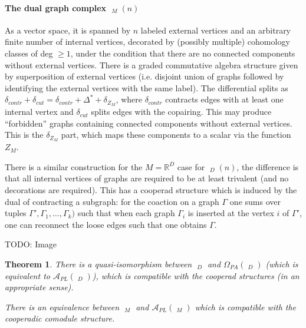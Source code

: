\documentclass{scrartcl}
\theoremstyle{plain}
\newtheorem{theorem}{Theorem}[section]
\theoremstyle{definition}
\newcommand{\R}{\mathbb R}
\DeclareMathOperator{\cConf}{\overline{Conf}}
\DeclareMathOperator{\coGraphs}{{}^*Graphs}
\begin{document}
\paragraph{The dual graph complex $\coGraphs_M(n)$} As a vector space, it is spanned by $n$ labeled external vertices and an arbitrary finite number of internal vertices, decorated by (possibly multiple) cohomology classes of deg $\geq 1$, under the condition that there are no connected components without external vertices. There is a graded commutative algebra structure given by superposition of external vertices (i.e. disjoint union of graphs followed by identifying the external vertices with the same label). The differential splits as $\delta_{contr} + \delta_{cut} = \delta_{contr} + \Delta^* + \delta_{Z_M}$, where $\delta_{contr}$ contracts edges with at least one internal vertex and $\delta_{cut}$ splits edges with the copairing. This may produce ``forbidden'' graphs containing connected components without external vertices. This is the $\delta_{Z_M}$ part, which maps these components to a scalar via the function $Z_M$.

There is a similar construction for the $M=\R^D$ case for $\coGraphs_D(n)$, the difference is that all internal vertices of graphs are required to be at least trivalent (and no decorations are required). This has a cooperad structure which is induced by the dual of contracting a subgraph: for the coaction on a graph $\Gamma$ one sums over tuples $\Gamma', \Gamma_1, \dots, \Gamma_k)$ such that when each graph $\Gamma_i$ is inserted at the vertex $i$ of $\Gamma'$, one can reconnect the loose edges such that one obtains $\Gamma$.  

TODO: Image

\begin{theorem}
There is a quasi-isomorphism between $\coGraphs_D$ and $\Omega_{PA}(\cConf_D)$ (which is equivalent to $\mathcal A_{PL}(\cConf_D)$), which is compatible with the cooperad structures (in an appropriate sense).

There is an equivalence between $\coGraphs_M$ and $\mathcal A_{PL}(\cConf_M)$ which is compatible with the cooperadic comodule structure. 
\end{theorem}
\end{document}
